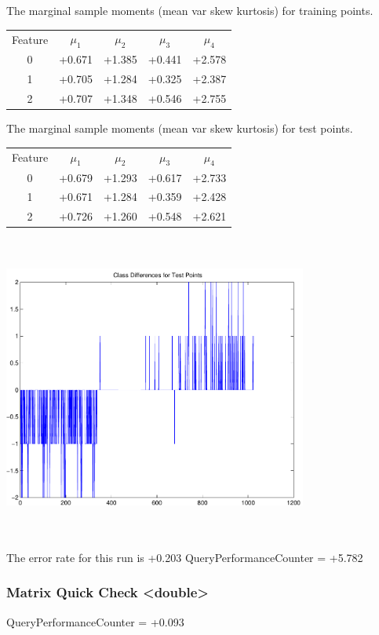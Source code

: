 \documentclass[9pt]{article}
\theoremstyle{plain}
\theoremstyle{definition}
\theoremstyle{remark}
\numberwithin{equation}{section}
\begin{document}
The marginal sample moments (mean var skew kurtosis) for training points.\newline
\begin{tabular}{ c |  c  c  c  c}
Feature & $\mu_1$ & $\mu_2$ & $\mu_3$ & $\mu_4$ \\
0 & +0.671 & +1.385 & +0.441& +2.578 \\
\hline
1 & +0.705 & +1.284 & +0.325& +2.387 \\
\hline
2 & +0.707 & +1.348 & +0.546& +2.755 \\
\hline
\end{tabular}
\newline
The marginal sample moments (mean var skew kurtosis) for test points.\newline
\begin{tabular}{ c | c  c  c  c}
Feature & $\mu_1$ & $\mu_2$ & $\mu_3$ & $\mu_4$ \\
0 & +0.679 & +1.293 & +0.617& +2.733\\
\hline
1 & +0.671 & +1.284 & +0.359& +2.428\\
\hline
2 & +0.726 & +1.260 & +0.548& +2.621\\
\hline
\end{tabular}\newline
\includegraphics[width=10.0cm,height=10.0cm]{classDiffs.pdf}

The error rate for this run is +0.203\newline
QueryPerformanceCounter  =  +5.782
\subsubsection{Matrix Quick Check <double>}
QueryPerformanceCounter  =  +0.093
\end{document}
